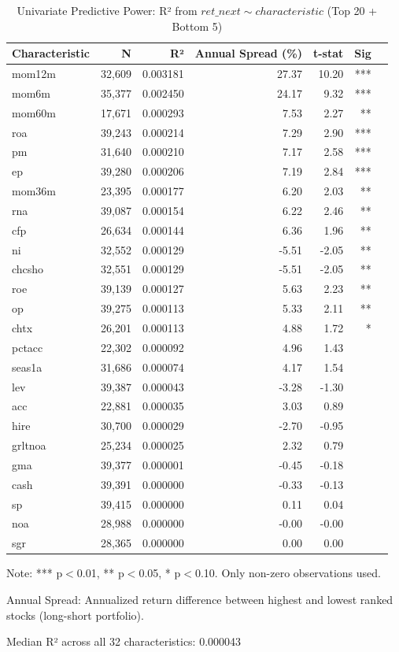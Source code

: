 \begin{table}[htbp]
\centering
\caption{Univariate Predictive Power: R² from $ret\_next \sim characteristic$ (Top 20 + Bottom 5)}
\label{tab:univariate_r2}
\small
\begin{tabular}{lrrrrrl}
\hline
Characteristic & N & R² & Annual Spread (\%) & t-stat & Sig \\ 
  \hline
mom12m & 32,609 & 0.003181 & 27.37 & 10.20 & *** \\ 
  mom6m & 35,377 & 0.002450 & 24.17 & 9.32 & *** \\ 
  mom60m & 17,671 & 0.000293 & 7.53 & 2.27 & ** \\ 
  roa & 39,243 & 0.000214 & 7.29 & 2.90 & *** \\ 
  pm & 31,640 & 0.000210 & 7.17 & 2.58 & *** \\ 
  ep & 39,280 & 0.000206 & 7.19 & 2.84 & *** \\ 
  mom36m & 23,395 & 0.000177 & 6.20 & 2.03 & ** \\ 
  rna & 39,087 & 0.000154 & 6.22 & 2.46 & ** \\ 
  cfp & 26,634 & 0.000144 & 6.36 & 1.96 & ** \\ 
  ni & 32,552 & 0.000129 & -5.51 & -2.05 & ** \\ 
  chcsho & 32,551 & 0.000129 & -5.51 & -2.05 & ** \\ 
  roe & 39,139 & 0.000127 & 5.63 & 2.23 & ** \\ 
  op & 39,275 & 0.000113 & 5.33 & 2.11 & ** \\ 
  chtx & 26,201 & 0.000113 & 4.88 & 1.72 & * \\ 
  pctacc & 22,302 & 0.000092 & 4.96 & 1.43 &  \\ 
  seas1a & 31,686 & 0.000074 & 4.17 & 1.54 &  \\ 
  lev & 39,387 & 0.000043 & -3.28 & -1.30 &  \\ 
  acc & 22,881 & 0.000035 & 3.03 & 0.89 &  \\ 
  hire & 30,700 & 0.000029 & -2.70 & -0.95 &  \\ 
  grltnoa & 25,234 & 0.000025 & 2.32 & 0.79 &  \\ 
  gma & 39,377 & 0.000001 & -0.45 & -0.18 &  \\ 
  cash & 39,391 & 0.000000 & -0.33 & -0.13 &  \\ 
  sp & 39,415 & 0.000000 & 0.11 & 0.04 &  \\ 
  noa & 28,988 & 0.000000 & -0.00 & -0.00 &  \\ 
  sgr & 28,365 & 0.000000 & 0.00 & 0.00 &  \\ 
   \hline
\end{tabular}
\begin{tablenotes}
\footnotesize
\item Note: *** p$<$0.01, ** p$<$0.05, * p$<$0.10. Only non-zero observations used.
\item Annual Spread: Annualized return difference between highest and lowest ranked stocks (long-short portfolio).
\item Median R² across all 32 characteristics:  0.000043 
\end{tablenotes}
\end{table}
